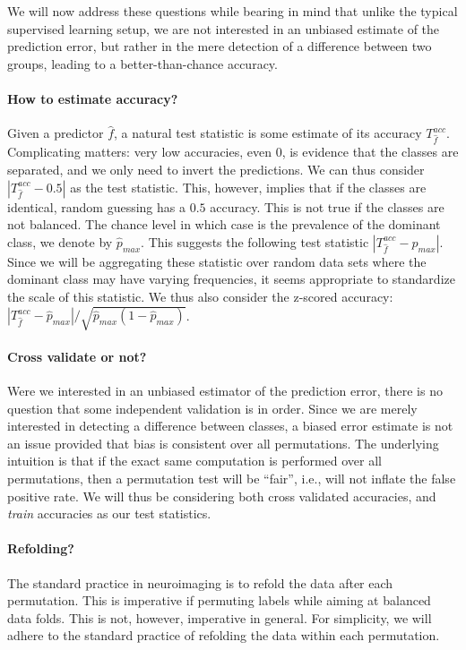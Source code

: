 \documentclass[12pt,a4paper]{article}
\newcommand{\hyp}{f} %
\newcommand{\hypEstim}{\hat{\hyp}} %
\newcommand{\acc}{T^{acc}}
\newcommand{\dominant}{\hat{p}_{max}}
\begin{document}
We will now address these questions while bearing in mind that unlike the typical supervised learning setup, we are not interested in an unbiased estimate of the prediction error, but rather in the mere detection of a difference between two groups, leading to a better-than-chance accuracy. 

\paragraph{How to estimate accuracy?}
\label{sec:estimate_accuracy}
Given a predictor $\hypEstim$, a natural test statistic is some estimate of its accuracy $\acc_{\hypEstim}$.
Complicating matters: very low accuracies, even $0$, is evidence that the classes are separated, and we only need to invert the predictions. 
We can thus consider $|\acc_{\hypEstim}-0.5|$ as the test statistic.
This, however, implies that if the classes are identical, random guessing has a $0.5$ accuracy. This is not true if the classes are not balanced. 
The chance level in which case is the prevalence of the dominant class, we denote by $\dominant$.
This suggests the following test statistic $|\acc_{\hypEstim}-\dominant|$.
Since we will be aggregating these statistic over random data sets where the dominant class may have varying frequencies, it seems appropriate to standardize the scale of this statistic. 
We thus also consider the z-scored accuracy: $|\acc_{\hypEstim}-\dominant|/\sqrt{\dominant(1-\dominant)}$.


\paragraph{Cross validate or not?}
Were we interested in an unbiased estimator of the prediction error, there is no question that some independent validation is in order. 
Since we are merely interested in detecting a difference between classes, a biased error estimate is not an issue provided that bias is consistent over all permutations. 
The underlying intuition is that if the exact same computation is performed over all permutations, then a permutation test will be ``fair'', i.e., will not inflate the false positive rate. 
We will thus be considering both cross validated accuracies, and \emph{train} accuracies as our test statistics. 


\paragraph{Refolding?}
The standard practice in neuroimaging is to refold the data after each permutation.
This is imperative if permuting labels while aiming at balanced data folds. 
This is not, however, imperative in general. 
For simplicity, we will adhere to the standard practice of refolding the data within each permutation.
\end{document}

